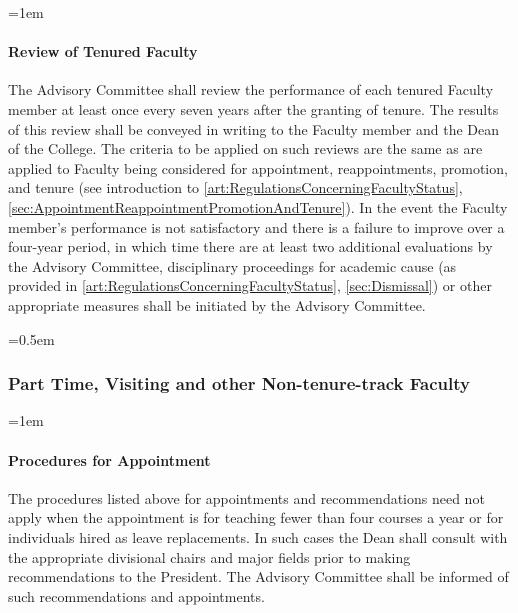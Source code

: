 \documentclass{manual}
\let\oldsubsubsection\subsubsection
\renewcommand\subsubsection{\leftskip=0.5em\oldsubsubsection}
\let\oldparagraph\paragraph
\renewcommand\paragraph{\leftskip=1em\oldparagraph}
\begin{document}
\paragraph{Review of Tenured Faculty}\label{par:ReviewOfTenuredFaculty}
The Advisory Committee shall review the performance of each tenured Faculty member at least once every seven years after the granting of tenure. The results of this review shall be conveyed in writing to the Faculty member and the Dean of the College. The criteria to be applied on such reviews are the same as are applied to Faculty being considered for appointment, reappointments, promotion, and tenure (see introduction to \cref{art:RegulationsConcerningFacultyStatus}, \cref{sec:AppointmentReappointmentPromotionAndTenure}). In the event the Faculty member's performance is not satisfactory and there is a failure to improve over a four-year period, in which time there are at least two additional evaluations by the Advisory Committee, disciplinary proceedings for academic cause (as provided in \cref{art:RegulationsConcerningFacultyStatus}, \cref{sec:Dismissal}) or other appropriate measures shall be initiated by the Advisory Committee.

\subsubsection{Part Time, Visiting and other Non-tenure-track Faculty}\label{sub:PartTimeVisitingAndOtherNonTenureTrackFaculty}

\paragraph{Procedures for Appointment}
The procedures listed above for appointments and recommendations need not apply when the appointment is for teaching fewer than four courses a year or for individuals hired as leave replacements. In such cases the Dean shall consult with the appropriate divisional chairs and major fields prior to making recommendations to the President. The Advisory Committee shall be informed of such recommendations and appointments.

\end{document}
